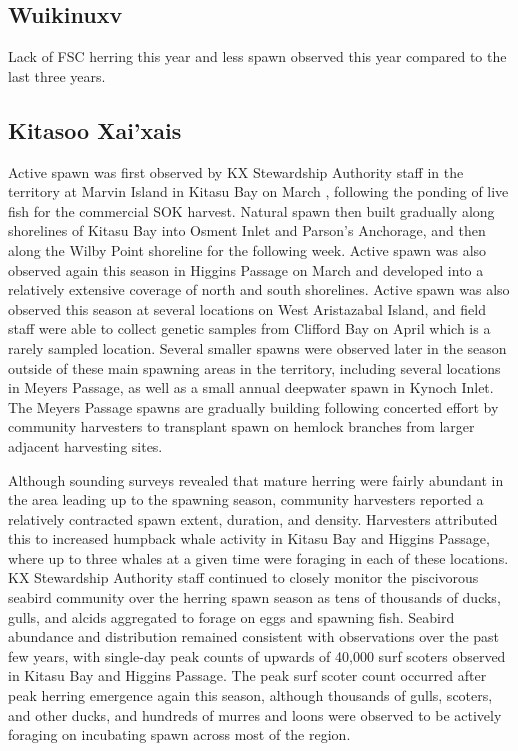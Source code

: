\subsection{Wuikinuxv}

Lack of FSC herring this year and
less spawn observed this year compared to the last three years.

\subsection{Kitasoo Xai'xais}

Active spawn was first observed by KX Stewardship Authority staff
in the territory at Marvin Island in Kitasu Bay on March ,
following the ponding of live fish for the commercial SOK harvest.
Natural spawn then built gradually along shorelines of
Kitasu Bay into Osment Inlet and Parson’s Anchorage, and then
along the Wilby Point shoreline for the following week.
Active spawn was also observed again this season
in Higgins Passage on March  and
developed into a relatively extensive coverage of north and south shorelines.
Active spawn was also observed this season at several locations on
West Aristazabal Island, and
field staff were able to collect genetic samples from
Clifford Bay on April  which is a rarely sampled location.
Several smaller spawns were observed later in the season
outside of these main spawning areas in the territory,
including several locations in Meyers Passage, as well as
a small annual deepwater spawn in Kynoch Inlet.
The Meyers Passage spawns are gradually building
following concerted effort by community harvesters
to transplant spawn on hemlock branches from larger adjacent harvesting sites.

Although sounding surveys revealed that mature herring were
fairly abundant in the area leading up to the spawning season,
community harvesters reported a relatively contracted
spawn extent, duration, and density.
Harvesters attributed this to increased humpback whale activity
in Kitasu Bay and Higgins Passage,
where up to three whales at a given time were foraging
in each of these locations.
KX Stewardship Authority staff continued to
closely monitor the piscivorous seabird community
over the herring spawn season as tens of thousands
of ducks, gulls, and alcids aggregated to forage on eggs and spawning fish.
Seabird abundance and distribution remained consistent
with observations over the past few years,
with single-day peak counts of upwards of
40,000 surf scoters observed in Kitasu Bay and Higgins Passage.
The peak surf scoter count occurred after
peak herring emergence again this season,
although thousands of gulls, scoters, and other ducks, and
hundreds of murres and loons were observed to be actively foraging
on incubating spawn across most of the region.
